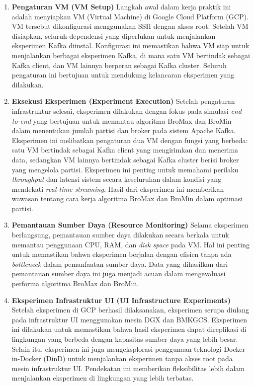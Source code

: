 \begin{enumerate}

	\item \textbf{Pengaturan VM (VM Setup)} Langkah awal dalam kerja praktik ini adalah menyiapkan VM (Virtual Machine) di Google Cloud Platform (GCP). VM tersebut dikonfigurasi menggunakan SSH dengan akses root. Setelah VM disiapkan, seluruh dependensi yang diperlukan untuk menjalankan eksperimen Kafka diinstal. Konfigurasi ini memastikan bahwa VM siap untuk menjalankan berbagai eksperimen Kafka, di mana satu VM bertindak sebagai Kafka client, dan VM lainnya berperan sebagai Kafka cluster. Seluruh pengaturan ini bertujuan untuk mendukung kelancaran eksperimen yang dilakukan.

	\item \textbf{Eksekusi Eksperimen (Experiment Execution)} Setelah pengaturan infrastruktur selesai, eksperimen dilakukan dengan fokus pada simulasi \textit{end-to-end} yang bertujuan untuk memantau algoritma BroMax dan BroMin dalam menentukan jumlah partisi dan broker pada sistem Apache Kafka. Eksperimen ini melibatkan pengaturan dua VM dengan fungsi yang berbeda: satu VM bertindak sebagai Kafka client yang mengirimkan dan menerima data, sedangkan VM lainnya bertindak sebagai Kafka cluster berisi broker yang mengelola partisi. Eksperimen ini penting untuk memahami perilaku \textit{throughput} dan latensi sistem secara keseluruhan dalam kondisi yang mendekati \textit{real-time streaming}. Hasil dari eksperimen ini memberikan wawasan tentang cara kerja algoritma BroMax dan BroMin dalam optimasi partisi.

	\item \textbf{Pemantauan Sumber Daya (Resource Monitoring)} Selama eksperimen berlangsung, pemantauan sumber daya dilakukan secara berkala untuk memantau penggunaan CPU, RAM, dan \textit{disk space} pada VM. Hal ini penting untuk memastikan bahwa eksperimen berjalan dengan efisien tanpa ada \textit{bottleneck} dalam pemanfaatan sumber daya. Data yang dihasilkan dari pemantauan sumber daya ini juga menjadi acuan dalam mengevaluasi performa algoritma BroMax dan BroMin.

	\item \textbf{Eksperimen Infrastruktur UI (UI Infrastructure Experiments)} Setelah eksperimen di GCP berhasil dilaksanakan, eksperimen serupa diulang pada infrastruktur UI menggunakan mesin DGX dan BMKGCS. Eksperimen ini dilakukan untuk memastikan bahwa hasil eksperimen dapat direplikasi di lingkungan yang berbeda dengan kapasitas sumber daya yang lebih besar. Selain itu, eksperimen ini juga mengeksplorasi penggunaan teknologi Docker-in-Docker (DinD) untuk menjalankan eksperimen tanpa akses root pada mesin infrastruktur UI. Pendekatan ini memberikan fleksibilitas lebih dalam menjalankan eksperimen di lingkungan yang lebih terbatas.


\end{enumerate}

